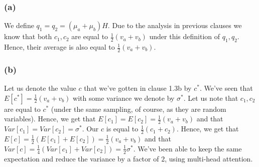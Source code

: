 \subsubsection*{(a)}
We define $q_1=q_2=(\mu_a + \mu_b)H$. Due to the analysis in previous clauses we know that both $c_1,c_2$ are equal to $\frac{1}{2}(v_a+v_b)$ under this definition of $q_1,q_2$. \newline
Hence, their average is also equal to $\frac{1}{2}(v_a+v_b)$.
\subsubsection*{(b)}
Let us denote the value $c$ that we've gotten in clause 1.3b by $c^*$. We've seen that $E[c^*]=\frac{1}{2}(v_a+v_b)$ with some variance we denote by $\sigma^*$. 
Let us note that $c_1,c_2$ are equal to $c^*$ (under the same sampling, of course, as they are random variables). Hence, we get that $E[c_1]=E[c_2]=\frac{1}{2}(v_a+v_b)$ and that $Var[c_1]=Var[c_2]=\sigma^*$. \newline
Our $c$ is equal to $\frac{1}{2}(c_1+c_2)$. Hence, we get that $E[c]=\frac{1}{2}(E[c_1]+E[c_2])=\frac{1}{2}(v_a+v_b)$ and that $Var[c]=\frac{1}{4}(Var[c_1]+Var[c_2])=\frac{1}{2}\sigma^*$. \newline
We've been able to keep the same expectation and reduce the variance by a factor of $2$, using multi-head attention. 